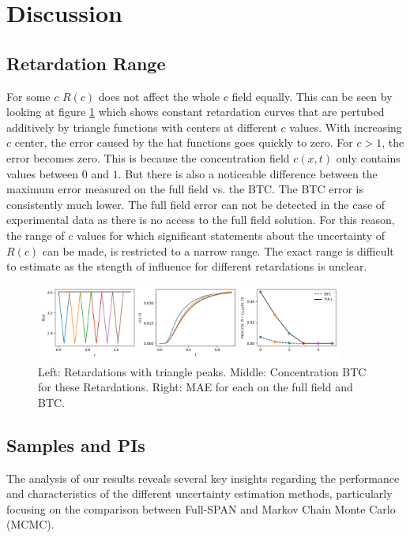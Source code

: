 \documentclass{article}
\begin{document}
\section{Discussion}
\subsection{Retardation Range} %
For some $c$ $R(c)$ does not affect the whole $c$ field equally. This can be seen by looking at figure \ref{fig:triangle_ret_pertubation} which shows constant retardation curves that are pertubed additively by triangle functions with centers at different $c$ values. With increasing $c$ center, the error caused by the hat functions goes quickly to zero. For $c > 1$, the error becomes zero. This is because the concentration field $c(x,t)$ only contains values between $0$ and $1$. But there is also a noticeable difference between the maximum error measured on the full field vs. the BTC. The BTC error is consistently much lower.
The full field error can not be detected in the case of experimental data as there is no access to the full field solution. For this reason, the range of $c$ values for which significant statements about the uncertainty of $R(c)$ can be made, is restricted to a narrow range. The exact range is difficult to estimate as the stength of influence for different retardations is unclear.


\begin{figure}
    \centering
    \includegraphics[width=0.9\textwidth]{figs/triangle_ret_pertubation.png}
    \caption{Left: Retardations with triangle peaks. Middle: Concentration BTC for these Retardations. Right: MAE for each on the full field and BTC.}
    \label{fig:triangle_ret_pertubation}
\end{figure}


\subsection{Samples and PIs}
The analysis of our results reveals several key insights regarding the performance and characteristics of the different uncertainty estimation methods, particularly focusing on the comparison between Full-SPAN and Markov Chain Monte Carlo (MCMC).
\end{document}
